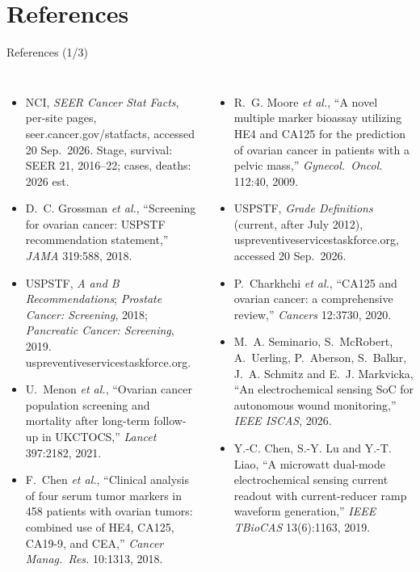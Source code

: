 \documentclass[10pt, aspectratio=169]{beamer}
\begin{document}
\section*{References}


\begin{frame}{References (1/3)}
\vspace{-0.2cm}
{\tiny
{}
\setlength{\leftmargini}{2.0em}
\begin{columns}[T]
\begin{itemize}\setlength{\itemsep}{2pt}\setlength{\parskip}{0pt}
  \item[{[1]}] NCI, \emph{SEER Cancer Stat Facts}, per-site pages, seer.cancer.gov/statfacts, accessed 20 Sep.\ 2026. Stage, survival: SEER 21, 2016--22; cases, deaths: 2026 est.
  \item[{[2]}] D.~C. Grossman \emph{et al.}, ``Screening for ovarian cancer: USPSTF recommendation statement,'' \emph{JAMA} 319:588, 2018.
  \item[{[3]}] USPSTF, \emph{A and B Recommendations}; \emph{Prostate Cancer: Screening}, 2018; \emph{Pancreatic Cancer: Screening}, 2019. uspreventiveservicestaskforce.org.
  \item[{[4]}] U.~Menon \emph{et al.}, ``Ovarian cancer population screening and mortality after long-term follow-up in UKCTOCS,'' \emph{Lancet} 397:2182, 2021.
  \item[{[5]}] F.~Chen \emph{et al.}, ``Clinical analysis of four serum tumor markers in 458 patients with ovarian tumors: combined use of HE4, CA125, CA19-9, and CEA,'' \emph{Cancer Manag.\ Res.} 10:1313, 2018.
\end{itemize}
\begin{itemize}\setlength{\itemsep}{2pt}\setlength{\parskip}{0pt}
  \item[{[6]}] R.~G. Moore \emph{et al.}, ``A novel multiple marker bioassay utilizing HE4 and CA125 for the prediction of ovarian cancer in patients with a pelvic mass,'' \emph{Gynecol.\ Oncol.} 112:40, 2009.
  \item[{[7]}] USPSTF, \emph{Grade Definitions} (current, after July 2012), uspreventiveservicestaskforce.org, accessed 20 Sep.\ 2026.
  \item[{[8]}] P.~Charkhchi \emph{et al.}, ``CA125 and ovarian cancer: a comprehensive review,'' \emph{Cancers} 12:3730, 2020.
  \item[{[9]}] M.~A. Seminario, S.~McRobert, A.~Uerling, P.~Aberson, S.~Balk{\i}r, J.~A. Schmitz and E.~J. Markvicka, ``An electrochemical sensing SoC for autonomous wound monitoring,'' \emph{IEEE ISCAS}, 2026.
  \item[{[10]}] Y.-C. Chen, S.-Y. Lu and Y.-T. Liao, ``A microwatt dual-mode electrochemical sensing current readout with current-reducer ramp waveform generation,'' \emph{IEEE TBioCAS} 13(6):1163, 2019.
\end{itemize}
\end{columns}}
\end{frame}
\end{document}
